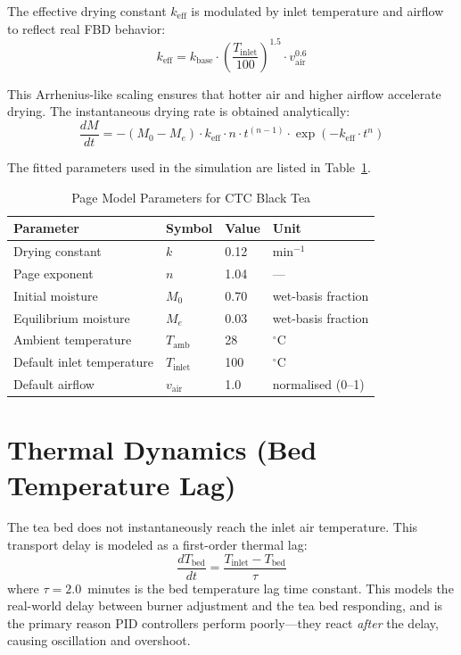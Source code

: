 ﻿\documentclass[12pt, a4paper]{report}
\begin{document}
\noindent The effective drying constant $k_{\text{eff}}$ is modulated by inlet temperature and airflow to reflect real FBD behavior:
\begin{equation}
k_{\text{eff}} = k_{\text{base}} \cdot \left(\frac{T_{\text{inlet}}}{100}\right)^{1.5} \cdot v_{\text{air}}^{0.6}
\label{eq:keff}
\end{equation}

\noindent This Arrhenius-like scaling ensures that hotter air and higher airflow accelerate drying. The instantaneous drying rate is obtained analytically:
\begin{equation}
\frac{dM}{dt} = -(M_0 - M_e) \cdot k_{\text{eff}} \cdot n \cdot t^{(n-1)} \cdot \exp(-k_{\text{eff}} \cdot t^n)
\end{equation}

\noindent The fitted parameters used in the simulation are listed in Table~\ref{tab:page_params}.

\begin{table}[H]
\centering
\caption{Page Model Parameters for CTC Black Tea}
\label{tab:page_params}
\begin{tabular}{@{}llll@{}}
\toprule
\textbf{Parameter} & \textbf{Symbol} & \textbf{Value} & \textbf{Unit} \\
\midrule
Drying constant & $k$ & 0.12 & min$^{-1}$ \\
Page exponent & $n$ & 1.04 & --- \\
Initial moisture & $M_0$ & 0.70 & wet-basis fraction \\
Equilibrium moisture & $M_e$ & 0.03 & wet-basis fraction \\
Ambient temperature & $T_{\text{amb}}$ & 28 & $^\circ$C \\
Default inlet temperature & $T_{\text{inlet}}$ & 100 & $^\circ$C \\
Default airflow & $v_{\text{air}}$ & 1.0 & normalised (0--1) \\
\bottomrule
\end{tabular}
\end{table}

\section{Thermal Dynamics (Bed Temperature Lag)}
The tea bed does not instantaneously reach the inlet air temperature. This transport delay is modeled as a first-order thermal lag:
\begin{equation}
\frac{dT_{\text{bed}}}{dt} = \frac{T_{\text{inlet}} - T_{\text{bed}}}{\tau}
\label{eq:thermal_lag}
\end{equation}
where $\tau = 2.0$~minutes is the bed temperature lag time constant. This models the real-world delay between burner adjustment and the tea bed responding, and is the primary reason PID controllers perform poorly---they react \emph{after} the delay, causing oscillation and overshoot.
\end{document}
